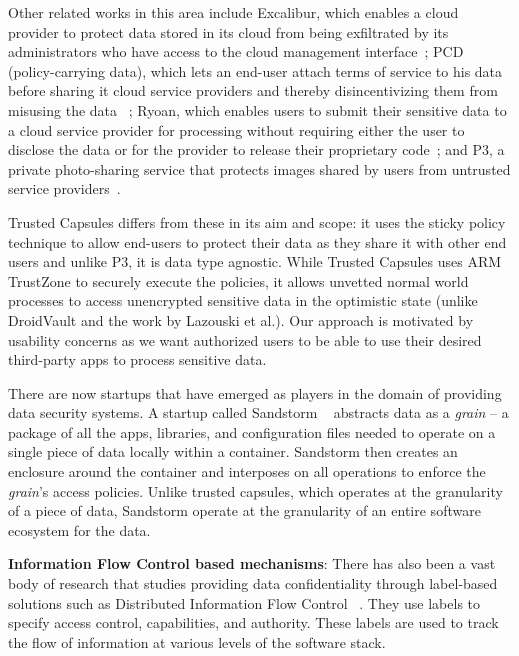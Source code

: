 Other related works in this area include Excalibur, which enables a cloud
provider to protect data stored in its cloud from being exfiltrated by its
administrators who have access to the cloud management
interface~\cite{excalibur}; PCD (policy-carrying data), which lets an end-user
attach terms of service to his data before sharing it cloud service providers
and thereby disincentivizing them from misusing the data ~\cite{policydata};
Ryoan, which enables users to submit their sensitive data to a cloud service
provider for processing without requiring either the user to disclose the data
or for the provider to release their proprietary code~\cite{ryoan}; and P3, a
private photo-sharing service that protects images shared by users from
untrusted service providers~\cite{p3}.

Trusted Capsules differs from these in its aim and scope: it uses the sticky
policy technique to allow end-users to protect their data as they share it
with other end users and unlike P3, it is data type agnostic. While Trusted
Capsules uses ARM TrustZone to securely execute the policies, it allows unvetted
normal world processes to access unencrypted sensitive data in the optimistic
state (unlike DroidVault and the work by Lazouski et al.). Our approach is
motivated by usability concerns as we want authorized users to be able to use
their desired third-party apps to process sensitive data.

There are now startups that have emerged as players in the domain of providing
data security systems. A startup called Sandstorm ~\cite{sandstorm} abstracts
data as a \textit{grain} -- a package of all the apps, libraries, and
configuration files needed to operate on a single piece of data locally within a
container. Sandstorm then creates an enclosure around the container and
interposes on all operations to enforce the \textit{grain}'s access policies.
Unlike trusted capsules, which operates at the granularity of a piece of data,
Sandstorm operate at the granularity of an entire software ecosystem for the
data.

\textbf{Information Flow Control based mechanisms}: There has also been a vast
body of research that studies providing data confidentiality through label-based
solutions such as Distributed Information Flow Control ~\cite{jif, asbestos,
histar, dstar, laminar, aeolus, flume}. They use labels to specify access
control, capabilities, and authority. These labels are used to track the flow of
information at various levels of the software stack. 

